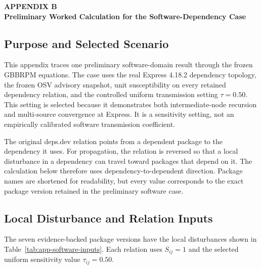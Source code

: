 \clearpage
\thispagestyle{empty}
\label{app:software-worked-example}

{
\centering
\textbf{APPENDIX B}\\
\textbf{Preliminary Worked Calculation for the Software-Dependency Case}\par
}
\vspace{\baselineskip}

\subsection{Purpose and Selected Scenario}

This appendix traces one preliminary software-domain result through the frozen
GBBRPM equations. The case uses the real Express 4.18.2 dependency topology,
the frozen OSV advisory snapshot, unit susceptibility on every retained
dependency relation, and the controlled uniform transmission setting
\(\tau=0.50\). This setting is selected because it demonstrates both
intermediate-node recursion and multi-source convergence at Express. It is a
sensitivity setting, not an empirically calibrated software transmission
coefficient.

The original deps.dev relation points from a dependent package to the
dependency it uses. For propagation, the relation is reversed so that a local
disturbance in a dependency can travel toward packages that depend on it. The
calculation below therefore uses dependency-to-dependent direction. Package
names are shortened for readability, but every value corresponds to the exact
package version retained in the preliminary software case.

\subsection{Local Disturbance and Relation Inputs}

The seven evidence-backed package versions have the local disturbances shown
in Table~\ref{tab:app-software-inputs}. Each relation uses \(S_{ij}=1\) and
the selected uniform sensitivity value \(\tau_{ij}=0.50\).

